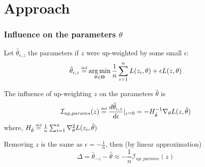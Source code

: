 \documentclass[UTF8]{beamer}
\newcommand\myeq{\stackrel{\mathclap{\tiny\mbox{def}}}{=}}
\DeclareMathOperator*{\argmin}{arg\,min}
\begin{document}
\section{Approach}
\begin{frame}
\frametitle{Influence on the parameters $\theta$}
Let $\hat{\theta}_{\epsilon, z}$ the parameters if $z$ were up-weighted by some small $\epsilon$:
\begin{equation} \nonumber
\hat{\theta}_{\epsilon, z} \myeq \argmin_{\theta\in\Theta}\frac{1}{n}\sum_{i=1}^nL(z_i, \theta) + \epsilon L(z, \theta)
\end{equation}

The influence of up-weighting $z$ on the parameters $\hat\theta$ is
\begin{equation}
\mathcal{I}_{up,params}(z)\myeq\frac{d\hat{\theta}_{\epsilon, z}}{d\epsilon}\vert_{\epsilon=0} = -H^{-1}_{\hat{\theta}}\nabla_\theta{}L(z, \hat{\theta}) 
\end{equation}
where, $H_{\hat\theta} \myeq \frac{1}{n}\sum_{i=1}^n\nabla^2_{\theta}L(z_i, \hat\theta)$

Removing $z$ is the same as $\epsilon = -\frac{1}{n}$, then (by linear approximation)
\begin{equation}
\Delta = \hat{\theta}_{-z} - \hat{\theta} \approx -\frac{1}{n}\mathcal{I}_{up,params}(z) \nonumber
\end{equation}
\end{frame}
\end{document}
